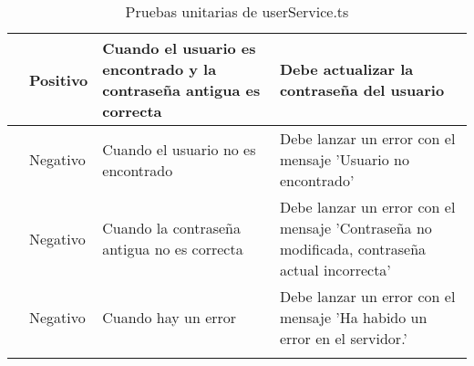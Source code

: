 \begin{small}
\begin{longtable}[H]{|>{\centering\arraybackslash}m{3cm}|>{\centering\arraybackslash}m{2cm}|>{\centering\arraybackslash}m{3cm}|>{\centering\arraybackslash}m{4cm}|}
		\multirow{4}{3cm}{Change password}
		                 & Positivo              & Cuando el usuario es encontrado y la contraseña antigua es correcta & Debe actualizar la contraseña del usuario                                                    \\
		\cline{2-4}
		                 & Negativo              & Cuando el usuario no es encontrado                                  & Debe lanzar un error con el mensaje 'Usuario no encontrado'                                  \\
		\cline{2-4}
		                 & Negativo              & Cuando la contraseña antigua no es correcta                         & Debe lanzar un error con el mensaje 'Contraseña no modificada, contraseña actual incorrecta' \\
		\cline{2-4}
		                 & Negativo              & Cuando hay un error                                                 & Debe lanzar un error con el mensaje 'Ha habido un error en el servidor.'                     \\
		\hline
		\caption{Pruebas unitarias de userService.ts}
	\end{longtable}
\end{small}
